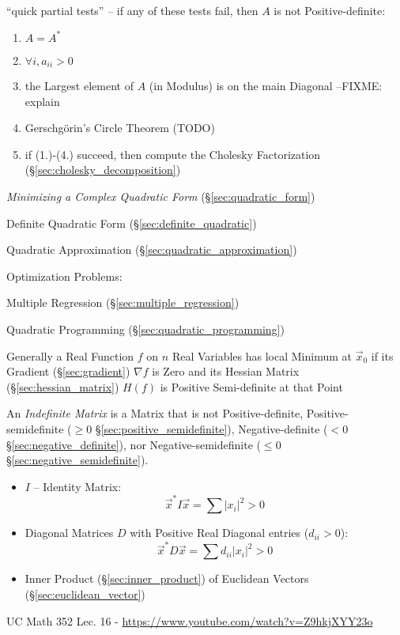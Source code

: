 ``quick partial tests'' -- if any of these tests fail, then $A$ is not
Positive-definite:
\begin{enumerate}
  \item $A = A^*$
  \item $\forall{i}, a_{ii} > 0$
  \item the Largest element of $A$ (in Modulus) is on the main Diagonal
    --FIXME: explain
  \item Gerschg\"orin's Circle Theorem (TODO)
  \item if (1.)-(4.) succeed, then compute the Cholesky Factorization
    (\S\ref{sec:cholesky_decomposition})
\end{enumerate}

\emph{Minimizing a Complex Quadratic Form} (\S\ref{sec:quadratic_form})

\fist Definite Quadratic Form (\S\ref{sec:definite_quadratic})

\fist Quadratic Approximation (\S\ref{sec:quadratic_approximation})

Optimization Problems:

\fist Multiple Regression (\S\ref{sec:multiple_regression})

\fist Quadratic Programming (\S\ref{sec:quadratic_programming})

Generally a Real Function $f$ on $n$ Real Variables has local Minimum at
$\vec{x}_0$ if its Gradient (\S\ref{sec:gradient}) $\nabla f$ is Zero and its
Hessian Matrix (\S\ref{sec:hessian_matrix}) $H(f)$ is Positive Semi-definite at
that Point

An \emph{Indefinite Matrix} is a Matrix that is not Positive-definite,
Positive-semidefinite ($\geq 0$ \S\ref{sec:positive_semidefinite}),
Negative-definite ($< 0$ \S\ref{sec:negative_definite}), nor
Negative-semidefinite ($\leq 0$ \S\ref{sec:negative_semidefinite}).

\begin{itemize}
  \item $I$ -- Identity Matrix:
    \[
      \vec{x}^*I\vec{x} = \sum |x_i|^2 > 0
    \]
  \item Diagonal Matrices $D$ with Positive Real Diagonal entries ($d_{ii} >
    0$):
    \[
      \vec{x}^*D\vec{x} = \sum d_{ii}|x_i|^2 > 0
    \]
  \item Inner Product (\S\ref{sec:inner_product}) of Euclidean Vectors
    (\S\ref{sec:euclidean_vector})
\end{itemize}


UC Math 352 Lec. 16 - \url{https://www.youtube.com/watch?v=Z9hkjXYY23o}



